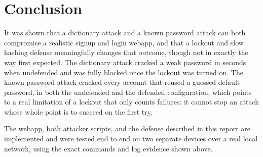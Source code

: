 \documentclass[11pt]{article}
\begin{document}
\section{Conclusion}
\label{sec:conclusion}

It was shown that a dictionary attack and a known password attack can both
compromise a realistic signup and login webapp, and that a lockout and
slow hashing defense meaningfully changes that outcome, though not in
exactly the way first expected. The dictionary attack cracked a weak
password in seconds when undefended and was fully blocked once the lockout
was turned on. The known password attack cracked every account that reused
a guessed default password, in both the undefended and the defended
configuration, which points to a real limitation of a lockout that only
counts failures: it cannot stop an attack whose whole point is to succeed
on the first try.

The webapp, both attacker scripts, and the defense described in this
report are implemented and were tested end to end on two separate devices
over a real local network, using the exact commands and log evidence shown
above.
\end{document}
